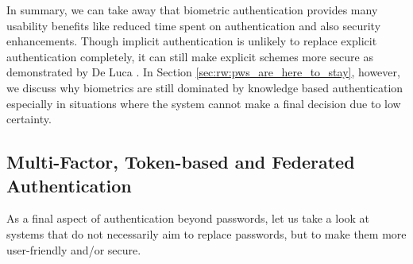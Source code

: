 	In summary, we can take away that biometric authentication provides many usability benefits like reduced time spent on authentication and also security enhancements. Though implicit authentication is unlikely to replace explicit authentication completely, it can still make explicit schemes more secure as demonstrated by De Luca \etal \cite{DeLuca2012TouchMeOnce}. In Section \ref{sec:rw:pws_are_here_to_stay}, however, we discuss why biometrics are still dominated by knowledge based authentication especially in situations where the system cannot make a final decision due to low certainty. 
	
	
		
	\subsection{Multi-Factor, Token-based and Federated Authentication}\label{sec:rw:shared_auth_tokens}
	As a final aspect of authentication beyond passwords, let us take a look at systems that do not necessarily aim to replace passwords, but to make them more user-friendly and/or secure. 
	
